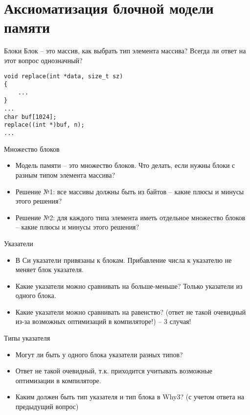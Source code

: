 \documentclass[hyperref={unicode=true}]{beamer}
\begin{document}
    \section{Аксиоматизация блочной модели памяти}
\fi

    \begin{frame}[fragile]{Блоки}
    Блок -- это массив, как выбрать тип элемента массива?
    Всегда ли ответ на этот вопрос однозначный?

    \begin{lstlisting}
void replace(int *data, size_t sz)
{
    ...
}
...
char buf[1024];
replace((int *)buf, n);
...
    \end{lstlisting}
    \end{frame}

    \begin{frame}{Множество блоков}
    \begin{itemize}
    \item
    Модель памяти -- это множество блоков. Что делать,
    если нужны блоки с разным типом элемента массива?
    \item
    Решение №1: все массивы должны быть из байтов
    -- какие плюсы и минусы этого решения?
    \item
    Решение №2: для каждого типа элемента
    иметь отдельное множество блоков
    -- какие плюсы и минусы этого решения?
    \end{itemize}
    \end{frame}

    \begin{frame}{Указатели}
    \begin{itemize}
    \item
    В Си указатели привязаны к блокам. Прибавление
    числа к указателю не меняет блок указателя.
    \item
    Какие указатели можно сравнивать на больше-меньше?
    Только указатели из одного блока.
    \item
    Какие указатели можно сравнивать на равенство?
    (ответ не такой очевидный из-за возможных
    оптимизаций в компиляторе!) -- 3 случая!
    \end{itemize}
    \end{frame}

    \begin{frame}{Типы указателя}
    \begin{itemize}
    \item
    Могут ли быть у одного блока указатели
    разных типов?
    \item
    Ответ не такой очевидный, т.к. приходится
    учитывать возможные оптимизации в компиляторе.
    \item
    Каким должен быть тип указателя и тип блока
    в Why3? (с учетом ответа на предыдущий вопрос)
    \end{itemize}
    \end{frame}
\end{document}
